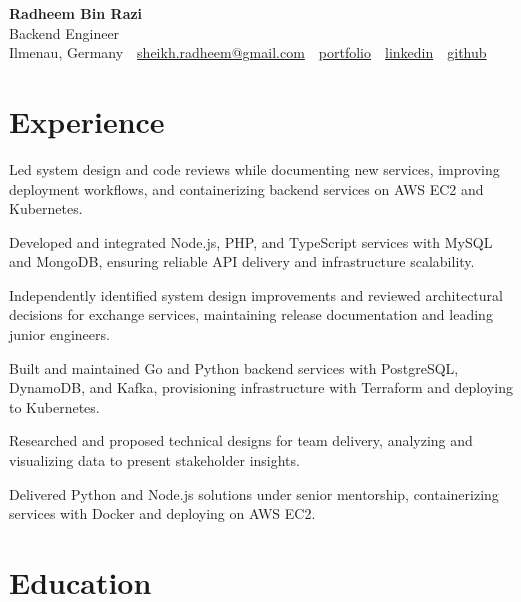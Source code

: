 \documentclass[11pt,a4paper]{resume}
\makeatletter
\newcommand{\Portfolio}{https://radheem.github.io/my-cv}
\newcommand{\PortfolioText}{portfolio}
\newcommand{\GitHub}{https://github.com/radheem}
\newcommand{\LinkedIn}{https://www.linkedin.com/in/radheem-razi}
\newcommand{\Email}{sheikh.radheem@gmail.com}
\makeatother
\begin{document}
\begin{center}
  {\huge\bfseries Radheem Bin Razi}\\[3pt]
  {\large Backend Engineer}\\[6pt]
  \small
  Ilmenau, Germany \,\textbar\,
  \href{mailto:\Email}{\Email} \,\textbar\,
  \href{\Portfolio}{\PortfolioText} \,\textbar\,
  \href{\LinkedIn}{linkedin} \,\textbar\,
  \href{\GitHub}{github}
\end{center}
\vspace{2pt}

\section{Experience}

\bullets
  \item Led system design and code reviews while documenting new services, improving deployment workflows, and containerizing backend services on AWS EC2 and Kubernetes.
  \item Developed and integrated Node.js, PHP, and TypeScript services with MySQL and MongoDB, ensuring reliable API delivery and infrastructure scalability.
\bulletsend
\vspace{3pt}
\bullets
  \item Independently identified system design improvements and reviewed architectural decisions for exchange services, maintaining release documentation and leading junior engineers.
  \item Built and maintained Go and Python backend services with PostgreSQL, DynamoDB, and Kafka, provisioning infrastructure with Terraform and deploying to Kubernetes.
\bulletsend
\vspace{3pt}
\bullets
  \item Researched and proposed technical designs for team delivery, analyzing and visualizing data to present stakeholder insights.
  \item Delivered Python and Node.js solutions under senior mentorship, containerizing services with Docker and deploying on AWS EC2.
\bulletsend
\vspace{3pt}

\section{Education}
\end{document}
